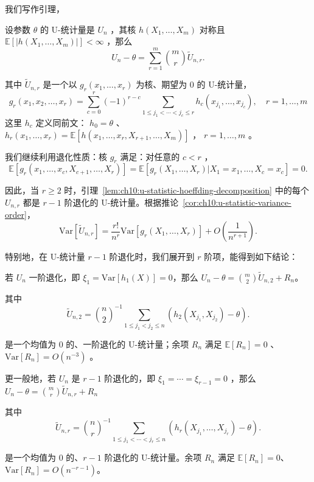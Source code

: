 我们写作引理，

\begin{lemma}\label{lem:ch10:u-statistic-hoeffding-decomposition}

设参数 $\theta$ 的 U-统计量是 $U_n$ ，其核 $h(X_1,\dots,X_m)$ 对称且 $\mathbb E[|h(X_1,\dots,X_m)|]<\infty$ ，那么
\[
U_n-\theta=\sum_{r=1}^m\binom mr\widetilde U_{n,r}.
\]

其中 $\widetilde U_{n,r}$ 是一个以 $g_r(x_1,\dots,x_r)$ 为核、期望为 0 的 U-统计量，
\[g_r(x_1,x_2,\dots,x_r)=\sum_{c=0}^r(-1)^{r-c}\sum_{1\le j_1<\cdots<j_c\le r}h_c(x_{j_1},\dots,x_{j_c}),\quad r=1,\dots,m\]
这里 $h_c$ 定义同前文： $h_0=\theta$ 、 $h_r(x_1,\dots,x_r)=\mathbb E[h(x_1,\dots,x_r,X_{r+1},\dots,X_{m})]$ ， $r=1,\dots,m$ 。

我们继续利用退化性质：核 $g_r$ 满足：对任意的 $c<r$ ，
\[
\mathbb E[g_r(x_1,\dots,x_c,X_{c+1},\dots,X_r)]=\mathbb E[g_r(X_1,\dots,X_r)|X_1=x_1,\dots,X_c=x_c]=0.
\]

因此，当 $r\ge 2$ 时，引理~\ref{lem:ch10:u-statistic-hoeffding-decomposition} 中的每个 $U_{n,r}$ 都是 $r-1$ 阶退化的 U-统计量。根据推论~\ref{cor:ch10:u-statistic-variance-order}，
\[
\mathrm{Var}[\widetilde U_{n,r}]=\frac{r!}{n^r}\mathrm{Var}[g_r(X_1,\dots,X_r)]+O\left(\frac1{n^{r+1}}\right).
\]

特别地，在 U-统计量 $r-1$ 阶退化时，我们展开到 $r$ 阶项，能得到如下结论：

\end{lemma}

\begin{corollary}[Hoeffding 分解]\label{cor:ch10:hoeffding-decomposition}
若 $U_n$ 一阶退化，即 $\xi_1=\mathrm{Var}[h_1(X)]=0$，那么 $U_n-\theta=\binom m2\widetilde U_{n,2}+R_n$。

其中
\[
\widetilde U_{n,2}=\binom n2^{-1}\sum_{1\le j_1<j_2\le n}(h_2(X_{j_1},X_{j_2})-\theta).
\]

是一个均值为 0 的、一阶退化的 U-统计量；余项 $R_n$ 满足 $\mathbb E[R_n]=0$ 、 $\mathrm{Var}[R_n]=O(n^{-3})$ 。

更一般地，若 $U_n$ 是 $r-1$ 阶退化的，即 $\xi_1=\cdots=\xi_{r-1}=0$ ，那么 $U_n-\theta=\binom mr\widetilde U_{n,r}+R_n$

其中
\[
\widetilde U_{n,r}=\binom nr^{-1}\sum_{1\le j_1<\cdots<j_r\le n}(h_r(X_{j_1},\dots,X_{j_r})-\theta).
\]

是一个均值为 0 的、$r-1$ 阶退化的 U-统计量。余项 $R_n$ 满足 $\mathbb E[R_n]=0$、$\mathrm{Var}[R_n]=O(n^{-r-1})$。
\end{corollary}

